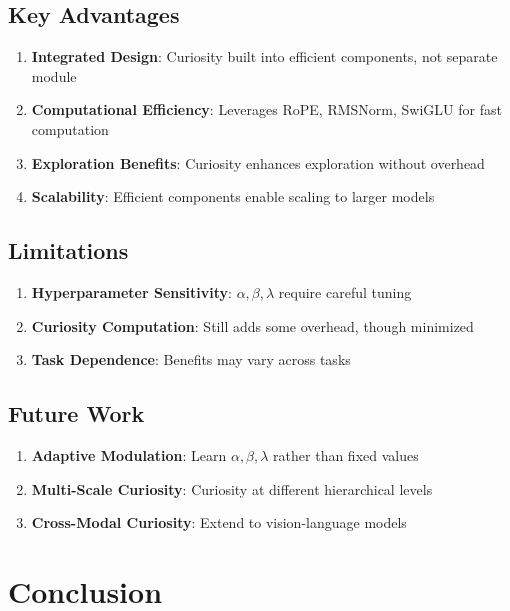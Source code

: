 \documentclass{IEEEtran}
\begin{document}
\subsection{Key Advantages}

\begin{enumerate}
    \item \textbf{Integrated Design}: Curiosity built into efficient components, not separate module
    \item \textbf{Computational Efficiency}: Leverages RoPE, RMSNorm, SwiGLU for fast computation
    \item \textbf{Exploration Benefits}: Curiosity enhances exploration without overhead
    \item \textbf{Scalability}: Efficient components enable scaling to larger models
\end{enumerate}

\subsection{Limitations}

\begin{enumerate}
    \item \textbf{Hyperparameter Sensitivity}: $\alpha, \beta, \lambda$ require careful tuning
    \item \textbf{Curiosity Computation}: Still adds some overhead, though minimized
    \item \textbf{Task Dependence}: Benefits may vary across tasks
\end{enumerate}

\subsection{Future Work}

\begin{enumerate}
    \item \textbf{Adaptive Modulation}: Learn $\alpha, \beta, \lambda$ rather than fixed values
    \item \textbf{Multi-Scale Curiosity}: Curiosity at different hierarchical levels
    \item \textbf{Cross-Modal Curiosity}: Extend to vision-language models
\end{enumerate}

\section{Conclusion}
\end{document}
